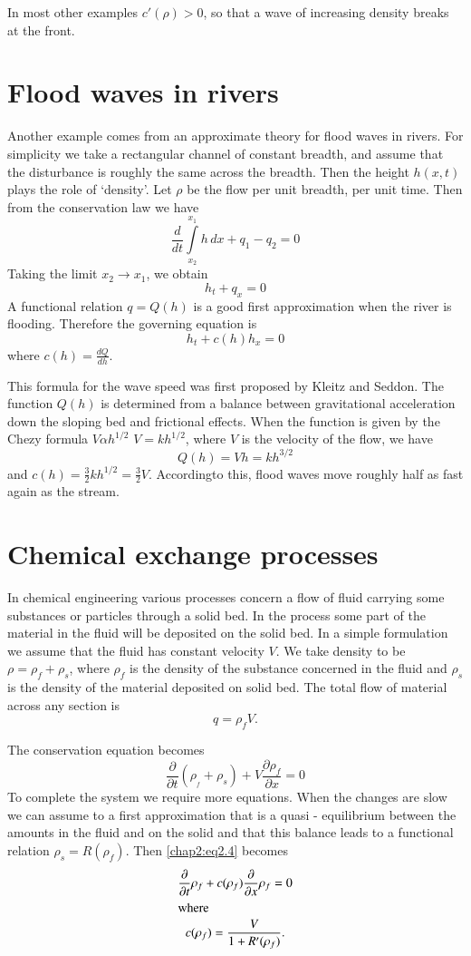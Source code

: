 In most other examples $c'(\rho)>0$, so that a wave of increasing density breaks at the front.

\section{Flood waves in rivers}\pageoriginale\label{chap2:sec2.2}

Another example comes from an approximate theory for flood waves in rivers. For simplicity we take a rectangular channel of constant breadth, and assume that the disturbance is roughly the same across the breadth. Then the height $h(x,t)$ plays the role of `density'. Let $\rho$ be the flow per unit breadth, per unit time. Then from the conservation law we have 
$$
\frac{d}{dt}\int\limits_{x_2}^{x_1}h\,dx+q_1-q_2=0
$$
Taking the limit $x_2\to x_1$, we obtain
$$
h_t+q_x=0
$$
A functional relation $q=Q(h)$ is a good first approximation when the river is flooding. Therefore the governing equation is 
$$
h_t+c(h)h_x=0
$$
where $c(h)=\frac{dQ}{dh}$.

This formula for the wave speed was first proposed by Kleitz and Seddon. The function $Q(h)$ is determined from a balance between gravitational acceleration down the sloping bed and frictional effects. When the function is given by the Chezy formula $V\alpha h^{1/2}$ \ie $V=kh^{1/2}$, where $V$ is the velocity of the flow, we have
$$
Q(h)=Vh=kh^{3/2}
$$
and $c(h)=\frac{3}{2} kh^{1/2}=\frac{3}{2}V$. According\pageoriginale to this, flood waves move roughly half as fast again as the stream.

\section{Chemical exchange processes}\label{chap2:sec2.3}

In chemical engineering various processes concern a flow of fluid carrying some substances or particles through a solid bed. In the process some part of the material in the fluid will be deposited on the solid bed. In a simple formulation we assume that the fluid has constant velocity $V$. We take density to be $\rho=\rho_f+\rho_s$, where $\rho_f$ is the density of the substance concerned in the fluid and $\rho_s$ is the density of the material deposited on solid bed. The total flow of material across any section is 
$$
q=\rho_f V.
$$

The conservation equation becomes
\begin{equation}
\frac{\partial}{\partial t}\left(\rho_{_f} +
\rho_s\right)+V\frac{\partial\rho_f} {\partial x} =
0\tag{2.4}\label{chap2:eq2.4} 
\end{equation}
To complete the system we require more equations. When the changes are
slow we can assume to a first approximation that is a
quasi - equilibrium between the amounts in the fluid and on the solid
and that this balance leads to a functional relation
$\rho_s=R(\rho_f)$. Then \eqref{chap2:eq2.4} becomes 
\begin{gather*}
\frac{\partial}{\partial t}\rho_f +c(\rho_f)\frac{\partial}{\partial x}\rho_f=0\\
\intertext{where}
c(\rho_f)=\frac{V}{1+R'(\rho_f)}.
\end{gather*}

